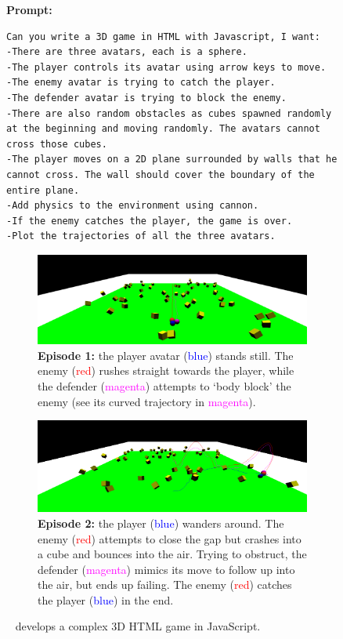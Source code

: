 \begin{figure}[H]
\begin{AIbox}{\DV}
{\bf Prompt:}
\vspace{-0.3cm}
\begin{verbatim}
Can you write a 3D game in HTML with Javascript, I want:
-There are three avatars, each is a sphere.
-The player controls its avatar using arrow keys to move.
-The enemy avatar is trying to catch the player.
-The defender avatar is trying to block the enemy.
-There are also random obstacles as cubes spawned randomly at the beginning and moving randomly. The avatars cannot cross those cubes.
-The player moves on a 2D plane surrounded by walls that he cannot cross. The wall should cover the boundary of the entire plane. 
-Add physics to the environment using cannon.
-If the enemy catches the player, the game is over.
-Plot the trajectories of all the three avatars.
\end{verbatim}
\begin{subfigure}
\centering
\captionsetup{width=1\linewidth}
\includegraphics[width=1\linewidth]{figures/3d_game_run_1.png}
\caption*{\scriptsize {\bf Episode 1:} the player avatar (\textcolor{blue}{blue}) stands still. The enemy (\textcolor{red}{red}) rushes straight towards the player, while the defender (\textcolor{magenta}{magenta}) attempts to `body block' the enemy (see its curved trajectory in \textcolor{magenta}{magenta}).}
\end{subfigure}
\hfill
\begin{subfigure}
\centering
\captionsetup{width=1\linewidth}
\includegraphics[width=1\linewidth]{figures/3d_game_run_2.png}
\caption*{\scriptsize {\bf Episode 2:} the player (\textcolor{blue}{blue}) wanders around. The enemy (\textcolor{red}{red}) attempts to close the gap but crashes into a cube and bounces into the air. Trying to obstruct, the defender (\textcolor{magenta}{magenta}) mimics its move to follow up into the air, but ends up failing. The enemy (\textcolor{red}{red}) catches the player (\textcolor{blue}{blue}) in the end.}
\end{subfigure}
\end{AIbox}
\caption{\DV~ develops a complex 3D HTML game in JavaScript.}
\label{fig:games}
\end{figure}


